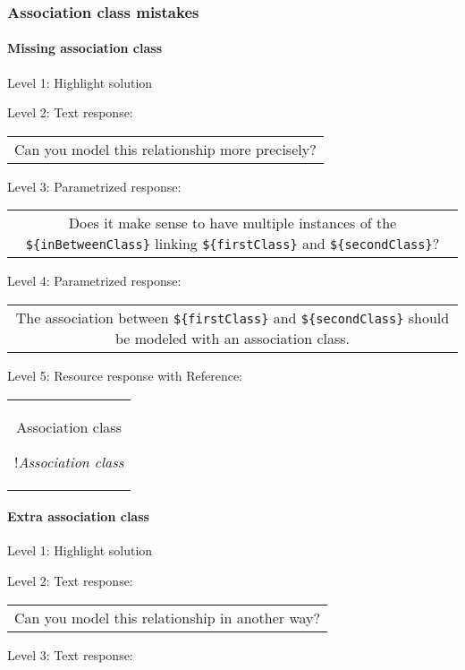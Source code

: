 \subsubsection{Association class mistakes}

\paragraph{Missing association class}

\noindent Level 1: Highlight solution \medskip

\noindent Level 2: Text response: \medskip

\begin{tabular}{|c}
Can you model this relationship more precisely?
\end{tabular} \medskip

\noindent Level 3: Parametrized response: \medskip

\begin{tabular}{|c}
Does it make sense to have multiple instances of the \verb|${inBetweenClass}| linking \verb|${firstClass}| and \verb|${secondClass}|?
\end{tabular} \medskip

\noindent Level 4: Parametrized response: \medskip

\begin{tabular}{|c}
The association between \verb|${firstClass}| and \verb|${secondClass}| should be modeled with an association class.
\end{tabular} \medskip

\noindent Level 5: Resource response with Reference:

\begin{tabular}{|c}
Association class

!\textit{Association class}
\end{tabular} \medskip


\paragraph{Extra association class}

\noindent Level 1: Highlight solution \medskip

\noindent Level 2: Text response: \medskip

\begin{tabular}{|c}
Can you model this relationship in another way?
\end{tabular} \medskip

\noindent Level 3: Text response: \medskip

